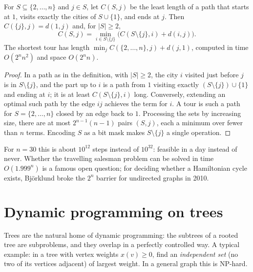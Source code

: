 \begin{theorem}\label{thm:heldkarp}
For $S\subseteq\{2,\dots,n\}$ and $j\in S$, let $C(S,j)$ be the least length of a path that starts at $1$, visits exactly the cities of $S\cup\{1\}$, and ends at $j$. Then $C(\{j\},j)=d(1,j)$ and, for $|S|\ge2$,
\[
C(S,j)=\min_{i\in S\setminus\{j\}}\big(C(S\setminus\{j\},i)+d(i,j)\big).
\]
The shortest tour has length $\min_jC(\{2,\dots,n\},j)+d(j,1)$, computed in time $O(2^nn^2)$ and space $O(2^nn)$.
\end{theorem}
\begin{proof}
In a path as in the definition, with $|S|\ge2$, the city $i$ visited just before $j$ is in $S\setminus\{j\}$, and the part up to $i$ is a path from $1$ visiting exactly $(S\setminus\{j\})\cup\{1\}$ and ending at $i$; it is at least
$C(S\setminus\{j\},i)$ long. Conversely, extending an optimal such path by the edge $ij$ achieves the term for $i$. A tour is such a path for $S=\{2,\dots,n\}$ closed by an edge back to $1$. Processing the sets by increasing size, there
are at most $2^{n-1}(n-1)$ pairs $(S,j)$, each a minimum over fewer than $n$ terms. Encoding $S$ as a bit mask makes $S\setminus\{j\}$ a single operation.
\end{proof}

For $n=30$ this is about $10^{12}$ steps instead of $10^{32}$: feasible in a day instead of never. Whether the travelling salesman problem can be solved in time $O(1.999^n)$ is a famous open question; for deciding whether a
Hamiltonian cycle exists, Bj\"orklund broke the $2^n$ barrier for undirected graphs in 2010.

\section{Dynamic programming on trees}\label{sec:treedp}

Trees are the natural home of dynamic programming: the subtrees of a rooted tree are subproblems, and they overlap in a perfectly controlled way. A typical example: in a tree with vertex weights $x(v)\ge0$, find
an \emph{independent set} (no two of its vertices adjacent) of largest weight. In a general graph this is NP-hard.

